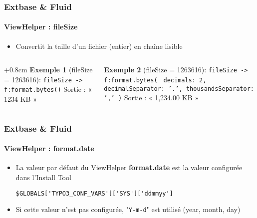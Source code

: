 \begin{frame}[fragile]
	\frametitle{Extbase \& Fluid}
	\framesubtitle{ViewHelper : fileSize}

	\begin{itemize}
		\item Convertit la taille d'un fichier (entier) en chaîne lisible\newline
	\end{itemize}
	
	\begin{columns}[T]

		\begin{column}{.5\textwidth}
			\advance\leftskip+0.8cm
			\smaller
				\textbf{Exemple 1} (fileSize = 1263616):\newline
				\texttt{fileSize -> f:format.bytes()}\newline
				\newline
				Sortie : « 1234 KB »
			\normalsize
		\end{column}
		\begin{column}{.5\textwidth}
			\smaller
				\textbf{Exemple 2} (fileSize = 1263616):\newline
				\texttt{fileSize -> f:format.bytes(}\newline
				\texttt{
				decimals: 2,\newline
				decimalSeparator: '.',\newline
				thousandsSeparator: ','\newline
				)}\newline
				\newline
				Sortie : « 1,234.00 KB »
			\normalsize
		\end{column}

	\end{columns}

\end{frame}


\begin{frame}[fragile]
	\frametitle{Extbase \& Fluid}
	\framesubtitle{ViewHelper : format.date}

	\lstset{
		basicstyle=\smaller\ttfamily
	}

	\begin{itemize}
		\item La valeur par défaut du ViewHelper \textbf{format.date} est la valeur configurée dans l'Install Tool

			\lstinline!$GLOBALS['TYPO3_CONF_VARS']['SYS']['ddmmyy']!

		\item Si cette valeur n'est pas configurée, "\texttt{Y-m-d}" est utilisé (year, month, day)

	\end{itemize}

\end{frame}

